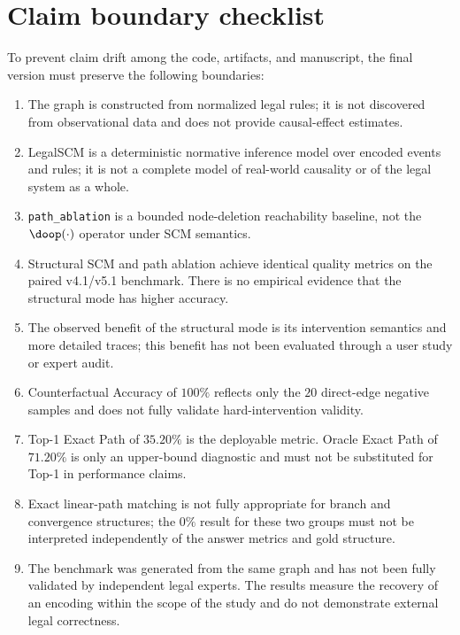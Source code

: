 \section{Claim boundary checklist}
\label{app:claims}

To prevent claim drift among the code, artifacts, and manuscript, the final
version must preserve the following boundaries:

\begin{enumerate}
    \item The graph is constructed from normalized legal rules; it is not
    discovered from observational data and does not provide causal-effect
    estimates.

    \item LegalSCM is a deterministic normative inference model over encoded
    events and rules; it is not a complete model of real-world causality or
    of the legal system as a whole.

    \item \texttt{path\_ablation} is a bounded node-deletion reachability
    baseline, not the $\doop(\cdot)$ operator under SCM semantics.

    \item Structural SCM and path ablation achieve identical quality metrics
    on the paired v4.1/v5.1 benchmark. There is no empirical evidence that
    the structural mode has higher accuracy.

    \item The observed benefit of the structural mode is its intervention
    semantics and more detailed traces; this benefit has not been evaluated
    through a user study or expert audit.

    \item Counterfactual Accuracy of $100\%$ reflects only the $20$
    direct-edge negative samples and does not fully validate hard-intervention
    validity.

    \item Top-1 Exact Path of $35.20\%$ is the deployable metric. Oracle
    Exact Path of $71.20\%$ is only an upper-bound diagnostic and must not be
    substituted for Top-1 in performance claims.

    \item Exact linear-path matching is not fully appropriate for branch and
    convergence structures; the $0\%$ result for these two groups must not be
    interpreted independently of the answer metrics and gold structure.

    \item The benchmark was generated from the same graph and has not been
    fully validated by independent legal experts. The results measure the
    recovery of an encoding within the scope of the study and do not
    demonstrate external legal correctness.


\end{enumerate}
